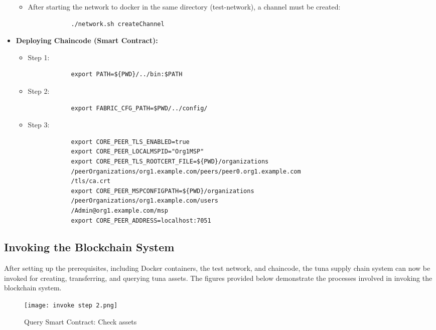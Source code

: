 \begin{itemize}
\begin{itemize}
		\item After starting the network to docker in the same directory (test-network), a channel must be created:
		\begin{verbatim}
			./network.sh createChannel
		\end{verbatim}
	\end{itemize}
	\item \textbf{Deploying Chaincode (Smart Contract):}
	\begin{itemize}
		\item Step 1:
		\begin{verbatim}
			export PATH=${PWD}/../bin:$PATH
		\end{verbatim}
		\item Step 2:
		\begin{verbatim}
			export FABRIC_CFG_PATH=$PWD/../config/
		\end{verbatim}
		\item Step 3:
		\begin{verbatim}
			export CORE_PEER_TLS_ENABLED=true
			export CORE_PEER_LOCALMSPID="Org1MSP"
			export CORE_PEER_TLS_ROOTCERT_FILE=${PWD}/organizations
			/peerOrganizations/org1.example.com/peers/peer0.org1.example.com
			/tls/ca.crt
			export CORE_PEER_MSPCONFIGPATH=${PWD}/organizations
			/peerOrganizations/org1.example.com/users
			/Admin@org1.example.com/msp
			export CORE_PEER_ADDRESS=localhost:7051
		\end{verbatim}
	\end{itemize}
\end{itemize}
\subsection{Invoking the Blockchain System}

After setting up the prerequisites, including Docker containers, the test network, and chaincode, the tuna supply chain system can now be invoked for creating, transferring, and querying tuna assets. The figures provided below demonstrate the processes involved in invoking the blockchain system.

\begin{figure}[H]
	\centering
	\texttt{[image: invoke step 2.png]}
	\caption{Query Smart Contract: Check assets}
	\label{fig: second step}
\end{figure}

